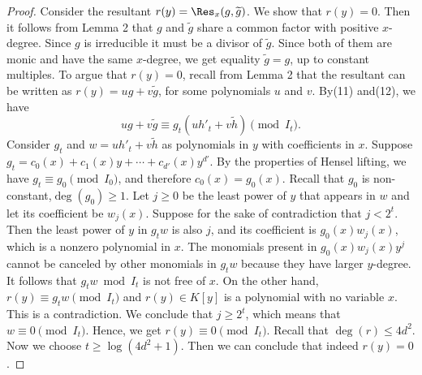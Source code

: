 \begin{proof}
Consider the resultant $r(y)=\Res_x(g,\widetilde g)$. We show that $r(y)=0$. Then it follows from Lemma 2 that $g$ and $\widetilde g$ share a common factor with positive $x$-degree. Since $g$ is irreducible it must be a divisor of $\widetilde g$. Since both of them are monic and have the same $x$-degree, we get equality $\widetilde g=g$, up to constant multiples.
To argue that $r(y)=0$, recall from Lemma 2 that the resultant can be written as $r(y)=ug+v\widetilde g$, for some polynomials $u$ and $v$. By(11) and(12), we have
\[ug+v\widetilde g\equiv g_t(uh'_t+v\widetilde h)\pmod{I_t}.\]
Consider $g_t$ and $w=uh'_t+v\widetilde h$ as polynomials in $y$ with coefficients in $x$. Suppose $g_t=c_0(x)+c_1(x)y+\cdots+c_{d'}(x)y^{d'}$. By the properties of Hensel lifting, we have $g_t\equiv g_0\pmod{I_0}$, and therefore $c_0(x)=g_0(x)$. Recall that $g_0$ is non-constant,$\deg(g_0)\geq1$.
Let $j\geq0$ be the least power of $y$ that appears in $w$ and let its coefficient be $w_j(x)$. Suppose for the sake of contradiction that $j<2^t$. Then the least power of $y$ in $g_tw$ is also $j$, and its coefficient is $g_0(x)w_j(x)$, which is a nonzero polynomial in $x$.
The monomials present in $g_0(x)w_j(x)y^j$ cannot be canceled by other monomials in $g_tw$ because they have larger $y$-degree. It follows that $g_tw\bmod I_t$ is not free of $x$. On the other hand,$r(y)\equiv g_tw\pmod{I_t}$ and $r(y)\in K[y]$ is a polynomial with no variable $x$. This is a contradiction.
We conclude that $j\geq2^t$, which means that $w\equiv0\pmod{I_t}$. Hence, we get $r(y)\equiv0\pmod{I_t}$. Recall that $\deg(r)\leq4d^2$. Now we choose $t\geq\log(4d^2+1)$. Then we can conclude that indeed $r(y)=0$.
\end{proof}
